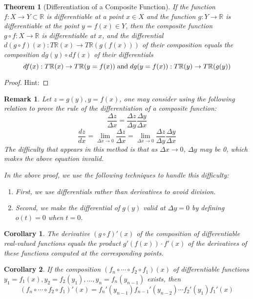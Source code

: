 \documentclass[onecolumn]{ctexart}
\newtheorem{theorem}{Theorem}
\newtheorem{corollary}{Corollary}
\newtheorem{remark}{Remark}
\begin{document}
\begin{theorem}[Differentiation of a Composite Function]
  If the function $f: X \to Y \subset \mathbb{R}$ is differentiable at a point 
  $x \in X$ and the function $g: Y \to \mathbb{R}$ is differentiable at the 
  point $y = f(x) \in Y$, then the composite function $g \circ f: X \to 
  \mathbb{R}$ is differentiable at $x$, and the differential $d(g \circ f)(x): 
  T\mathbb{R}(x) \to T\mathbb{R}(g(f(x)))$ of their composition equals the 
  composition $dg(y) \circ df(x)$ of their differentials
  \[
    df(x): T\mathbb{R}(x) \to T\mathbb{R}(y = f(x)) \thickspace \textnormal{and} \thickspace dg(y = f(x)): T\mathbb{R}(y) \to T\mathbb{R}(g(y))
  \]
\end{theorem}
\begin{proof}
  Hint:
\end{proof}
\begin{remark}
  Let $z = g(y), y = f(x)$, one may consider using the following relation to 
  prove the rule of the differentiation of a composite function:
  \[
    \frac{\Delta z}{\Delta x} = \frac{\Delta z}{\Delta y} \frac{\Delta y}{\Delta x}
  \]
  \[
    \frac{dz}{dx} = \lim_{\Delta x \to 0} \frac{\Delta z}{\Delta x} = \lim_{\Delta x \to 0} \frac{\Delta z}{\Delta y} \frac{\Delta y}{\Delta x}
  \]
  The difficulty that appears in this method is that as $\Delta x \to 0$, 
  $\Delta y$ may be 0, which makes the above equation invalid.

  In the above proof, we use the following techniques to handle this difficulty:
  \begin{enumerate}
    \item First, we use differentials rather than derivatives to avoid division.
    \item Second, we make the differential of $g(y)$ valid at $\Delta y = 0$ by 
    defining $o(t) = 0$ when $t = 0$.
  \end{enumerate}
\end{remark}

\begin{corollary}
  The derivative $(g \circ f)'(x)$ of the composition of differentiable 
  real-valued functions equals the product $g'(f(x))\cdot f'(x)$ of the 
  derivatives of these functions computed at the corresponding points.
\end{corollary}

\begin{corollary}
  If the composition $(f_n \circ \cdots \circ f_2 \circ f_1)(x)$ of 
  differentiable functions $y_1 = f_1(x), y_2 = f_2(y_1), \ldots, y_n = 
  f_n(y_{n-1})$ exists, then
  \[
    (f_n \circ \cdots \circ f_2 \circ f_1)'(x) = f_n'(y_{n-1}) f_{n-1}'(y_{n-2}) \cdots f_2'(y_1) f_1'(x)
  \]
\end{corollary}
\end{document}
